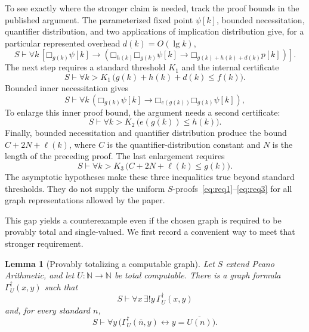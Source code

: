 \documentclass[11pt]{article}
\newtheorem{lemma}[theorem]{Lemma}
\theoremstyle{definition}
\theoremstyle{remark}
\newcommand{\N}{\mathbb{N}}
\newcommand{\elln}{\ell}
\newcommand{\Boxb}[1]{\mathord{\Box}_{#1}}
\begin{document}
To see exactly where the stronger claim is needed, track the proof bounds in the published argument.  The parameterized fixed point $\psi[k]$, bounded necessitation, quantifier distribution, and two applications of implication distribution give, for a particular represented overhead $d(k)=O(\lg k)$,
\begin{equation}\label{eq:pre44}
S\vdash\forall k\,
\left[
\Boxb{g(k)}\psi[k]
\to
\left(
\Boxb{h(k)}\Boxb{g(k)}\psi[k]
\to
\Boxb{g(k)+h(k)+d(k)}p[k]
\right)
\right].
\end{equation}
The next step requires a standard threshold $K_1$ and the internal certificate
\begin{equation}\label{eq:req1}
  S\vdash\forall k>K_1\,
  \bigl(g(k)+h(k)+d(k)\leq f(k)\bigr).
\end{equation}
Bounded inner necessitation gives
\[
S\vdash\forall k\,
\left(
\Boxb{g(k)}\psi[k]
\to
\Boxb{e(g(k))}\Boxb{g(k)}\psi[k]
\right),
\]
To enlarge this inner proof bound, the argument needs a second certificate:
\begin{equation}\label{eq:req2}
  S\vdash\forall k>K_2\,
  \bigl(e(g(k))\leq h(k)\bigr).
\end{equation}
Finally, bounded necessitation and quantifier distribution produce the bound $C+2N+\elln(k)$, where $C$ is the quantifier-distribution constant and $N$ is the length of the preceding proof.  The last enlargement requires
\begin{equation}\label{eq:req3}
  S\vdash\forall k>K_3\,
  \bigl(C+2N+\elln(k)\leq g(k)\bigr).
\end{equation}
The asymptotic hypotheses make these three inequalities true beyond standard thresholds.  They do not supply the uniform $S$-proofs~\eqref{eq:req1}--\eqref{eq:req3} for all graph representations allowed by the paper.

This gap yields a counterexample even if the chosen graph is required to be provably total and single-valued.  We first record a convenient way to meet that stronger requirement.

\begin{lemma}[Provably totalizing a computable graph]\label{lem:totalgraph}
Let $S$ extend Peano Arithmetic, and let $U:\N\to\N$ be total computable.  There is a graph formula $\Gamma_U^{\dagger}(x,y)$ such that
\[
  S\vdash\forall x\,\exists!y\,\Gamma_U^{\dagger}(x,y)
\]
and, for every standard $n$,
\[
  S\vdash\forall y\,
  \bigl(\Gamma_U^{\dagger}(\overline n,y)
  \leftrightarrow y=\overline{U(n)}\bigr).
\]
\end{lemma}
\end{document}
